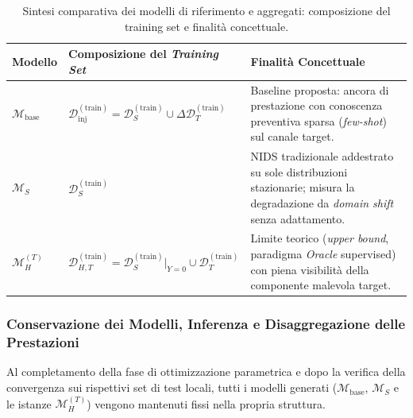 \begin{table}[H]
    \centering
    \caption{Sintesi comparativa dei modelli di riferimento e aggregati: composizione del training set e finalità concettuale.}
    \label{tab:modelli_aggregati}
    \begin{tabularx}{\textwidth}{l l >{\raggedright\arraybackslash}X}
    \toprule
    \textbf{Modello} & \textbf{Composizione del \textit{Training Set}} & \textbf{Finalità Concettuale} \\
    \midrule
    $\mathcal{M}_{\text{base}}$ &
    $\mathcal{D}_{\text{inj}}^{(\text{train})} = \mathcal{D}_{S}^{(\text{train})} \cup \Delta \mathcal{D}_{T}^{(\text{train})}$ &
    Baseline proposta: ancora di prestazione con conoscenza preventiva sparsa (\textit{few-shot}) sul canale target. \\
    \addlinespace
    $\mathcal{M}_{S}$ &
    $\mathcal{D}_{S}^{(\text{train})}$ &
    NIDS tradizionale addestrato su sole distribuzioni stazionarie; misura la degradazione da \textit{domain shift} senza adattamento. \\
    \addlinespace
    $\mathcal{M}_{H}^{(T)}$ &
    $\mathcal{D}_{H,T}^{(\text{train})} = \mathcal{D}_{S}^{(\text{train})}\big|_{Y=0} \cup \mathcal{D}_{T}^{(\text{train})}$ &
    Limite teorico (\textit{upper bound}, paradigma \textit{Oracle} supervised) con piena visibilità della componente malevola target. \\
    \bottomrule
    \end{tabularx}
\end{table}

\subsubsection{Conservazione dei Modelli, Inferenza e Disaggregazione delle Prestazioni}
\label{subsubsec:persistenza_aggregati}
Al completamento della fase di ottimizzazione parametrica e dopo la verifica della convergenza sui rispettivi set di test locali, tutti i modelli generati ($\mathcal{M}_{\text{base}}$, $\mathcal{M}_{S}$ e le istanze $\mathcal{M}_{H}^{(T)}$) vengono mantenuti fissi nella propria struttura.

